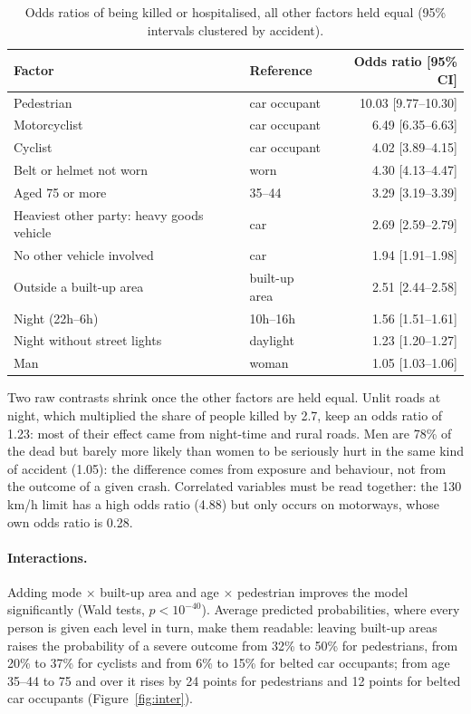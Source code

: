\documentclass[11pt,a4paper]{article}
\begin{document}
\begin{table}[H]
\centering\small
\caption{Odds ratios of being killed or hospitalised, all other factors held equal (95\% intervals
clustered by accident).}
\label{tab:or}
\begin{tabular}{@{}llr@{}}
\toprule
Factor & Reference & Odds ratio [95\% CI] \\
\midrule
Pedestrian & car occupant & 10.03 [9.77--10.30] \\
Motorcyclist & car occupant & 6.49 [6.35--6.63] \\
Cyclist & car occupant & 4.02 [3.89--4.15] \\
Belt or helmet not worn & worn & 4.30 [4.13--4.47] \\
Aged 75 or more & 35--44 & 3.29 [3.19--3.39] \\
Heaviest other party: heavy goods vehicle & car & 2.69 [2.59--2.79] \\
No other vehicle involved & car & 1.94 [1.91--1.98] \\
Outside a built-up area & built-up area & 2.51 [2.44--2.58] \\
Night (22h--6h) & 10h--16h & 1.56 [1.51--1.61] \\
Night without street lights & daylight & 1.23 [1.20--1.27] \\
Man & woman & 1.05 [1.03--1.06] \\
\bottomrule
\end{tabular}
\end{table}

Two raw contrasts shrink once the other factors are held equal. Unlit roads at night, which multiplied the
share of people killed by 2.7, keep an odds ratio of 1.23: most of their effect came from night-time and
rural roads. Men are 78\% of the dead but barely more likely than women to be seriously hurt in the same
kind of accident (1.05): the difference comes from exposure and behaviour, not from the outcome of a given
crash. Correlated variables must be read together: the 130\,km/h limit has a high odds ratio (4.88) but
only occurs on motorways, whose own odds ratio is 0.28.

\paragraph{Interactions.} Adding mode $\times$ built-up area and age $\times$ pedestrian improves the model
significantly (Wald tests, $p < 10^{-40}$). Average predicted probabilities, where every person is given
each level in turn, make them readable: leaving built-up areas raises the probability of a severe outcome
from 32\% to 50\% for pedestrians, from 20\% to 37\% for cyclists and from 6\% to 15\% for belted car
occupants; from age 35--44 to 75 and over it rises by 24 points for pedestrians and 12 points for belted
car occupants (Figure~\ref{fig:inter}).
\end{document}
